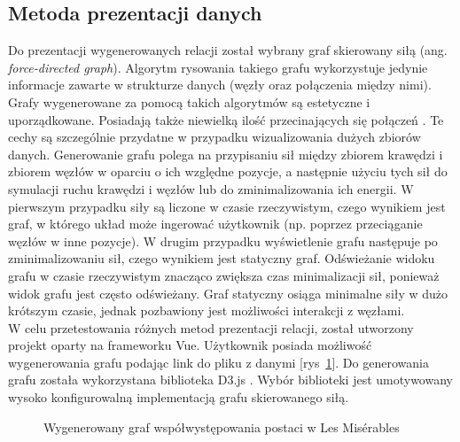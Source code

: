 \documentclass[12pt,a4paper]{article} %
\begin{document}
\subsection{Metoda prezentacji danych}
Do prezentacji wygenerowanych relacji został wybrany graf skierowany siłą (ang. \textit{force-directed graph}).
Algorytm rysowania takiego grafu wykorzystuje jedynie informacje zawarte w strukturze danych (węzły oraz połączenia między nimi).
Grafy wygenerowane za pomocą takich algorytmów są estetyczne i uporządkowane. Posiadają także niewielką ilość przecinających się połączeń \cite{yeet}. Te cechy są szczególnie przydatne w przypadku wizualizowania dużych zbiorów danych. Generowanie grafu polega na przypisaniu sił między zbiorem krawędzi i zbiorem węzłów w oparciu o ich względne pozycje, a następnie użyciu tych sił do symulacji ruchu krawędzi i węzłów lub do zminimalizowania ich energii\cite{yworks}. W pierwszym przypadku siły są liczone w czasie rzeczywistym, czego wynikiem jest graf, w którego układ może ingerować użytkownik (np. poprzez przeciąganie węzłów w inne pozycje). W drugim przypadku wyświetlenie grafu następuje po zminimalizowaniu sił, czego wynikiem jest statyczny graf. Odświeżanie widoku grafu w czasie rzeczywistym znacząco zwiększa czas minimalizacji sił, ponieważ widok grafu jest często odświeżany. Graf statyczny osiąga minimalne siły w dużo krótszym czasie, jednak pozbawiony jest możliwości interakcji z węzłami.\\

W celu przetestowania różnych metod prezentacji relacji, został utworzony projekt oparty na frameworku Vue. Użytkownik posiada możliwość wygenerowania grafu podając link do pliku z danymi [rys~\ref{fig:graph}]. Do generowania grafu została wykorzystana biblioteka D3.js \cite{d3}. Wybór biblioteki jest umotywowany wysoko konfigurowalną implementacją grafu skierowanego siłą.

\begin{figure}[h]
\caption{Wygenerowany graf współwystępowania postaci w Les Mis\'erables}
\label{fig:graph}
\centering
\end{figure}
\end{document}
